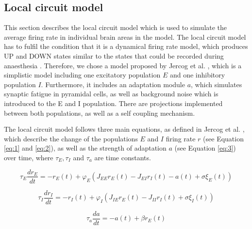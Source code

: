 \subsection{Local circuit model \label{sec:lc}}
\noindent
\indent This section describes the local circuit model which is used to simulate the average firing rate in individual brain areas in the model. The local circuit model has to fulfil the condition that it is a dynamical firing rate model, which produces UP and DOWN states similar to the states that could be recorded during anaesthesia \cite{ruiz-mejiasSlowFastRhythms2011}. Therefore, we chose a model proposed by Jercog et al. \cite{jercogUPDOWNCorticalDynamics2017}, which is a simplistic model including one excitatory population $E$ and one inhibitory population $I$. Furthermore, it includes an adaptation module $a$, which simulates synaptic fatigue in pyramidal cells, as well as background noise which is introduced to the E and I population. There are projections implemented between both populations, as well as a self coupling mechanism. 

The local circuit model follows three main equations, as defined in Jercog et al. \cite{jercogUPDOWNCorticalDynamics2017}, which describe the change of the populations $E$ and $I$ firing rate $r$ (see Equation \ref{eq:1} and \ref{eq:2}), as well as the strength of adaptation $a$ (see Equation \ref{eq:3}) over time, where $\tau_E, \tau_I$ and $\tau_a$ are time constants.

\begin{equation}\label{eq:1}
    \tau_E \frac{dr_E}{dt} = -r_E(t) + \varphi_E (J_{EE}r_E(t) - J_{EI}r_I(t)-a(t)+\sigma\xi_E(t))
\end{equation}

\begin{equation}\label{eq:2}
    \tau_I \frac{dr_I}{dt} = -r_I(t) + \varphi_I (J_{IE}r_E(t) - J_{II}r_I(t)+\sigma\xi_I(t))
\end{equation}

\begin{equation}\label{eq:3}
    \tau_a \frac{da}{dt} = -a(t) + \beta r_E(t)
\end{equation}

